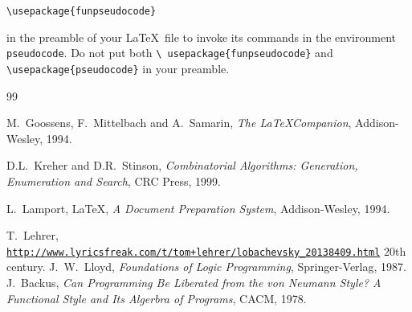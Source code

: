 \documentclass[a4]{article}
\begin{document}
\centerline{{\tt \textbackslash usepackage\{funpseudocode\}}} 

\noindent{}in the preamble of your \LaTeX\ file to invoke its commands in the
environment {\tt pseudocode}. Do not put both {\tt \textbackslash
  usepackage\{funpseudocode\}} and {\tt \textbackslash usepackage\{pseudocode\}}
in your preamble.
\begin{thebibliography}{99}

M.\ Goossens, F.\ Mittelbach and A.\ Samarin, {\it The \LaTeX Companion}, 
Addison-Wesley, 1994.

D.L.\ Kreher and D.R.\ Stinson,
{\em Combinatorial Algorithms: Generation, Enumeration and Search},
CRC Press, 1999.

L.\ Lamport, \LaTeX, 
{\em A Document Preparation System},
Addison-Wesley, 1994.

T.\ Lehrer,
{\tt
  \url{http://www.lyricsfreak.com/t/tom+lehrer/lobachevsky\_20138409.html}}
20th century.
J.\ W.\ Lloyd,
{\em Foundations of Logic Programming},
Springer-Verlag, 1987.
J.\ Backus,
{\it Can Programming Be Liberated from the von Neumann Style? A
  Functional Style and Its Algerbra of Programs},
CACM, 1978.

\end{thebibliography}
\end{document}
